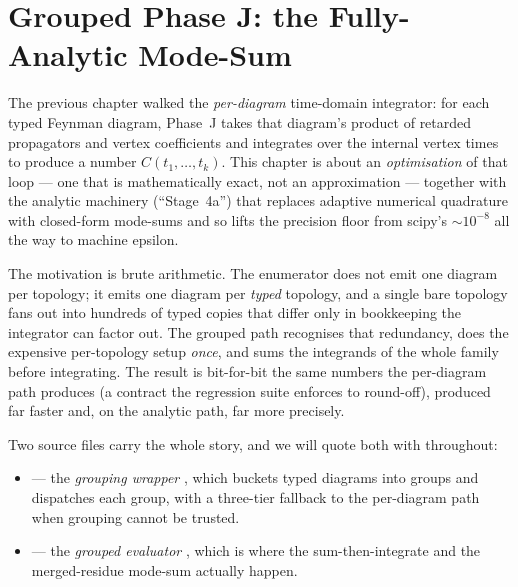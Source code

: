 \chapter{Grouped Phase J: the Fully-Analytic Mode-Sum}\label{ch:grouped-phasej}

The previous chapter walked the \emph{per-diagram} time-domain integrator: for
each typed Feynman diagram, Phase~J takes that diagram's product of retarded
propagators and vertex coefficients and integrates over the internal vertex
times to produce a number $C(t_1, \dots, t_k)$. This chapter is about an
\emph{optimisation} of that loop --- one that is mathematically exact, not an
approximation --- together with the analytic machinery (``Stage~4a'') that
replaces adaptive numerical quadrature with closed-form mode-sums and so lifts
the precision floor from scipy's $\sim\!10^{-8}$ all the way to machine epsilon.

The motivation is brute arithmetic. The enumerator does not emit one diagram per
topology; it emits one diagram per \emph{typed} topology, and a single bare
topology fans out into hundreds of typed copies that differ only in bookkeeping
the integrator can factor out. The grouped path recognises that redundancy, does
the expensive per-topology setup \emph{once}, and sums the integrands of the
whole family before integrating. The result is bit-for-bit the same numbers the
per-diagram path produces (a contract the regression suite enforces to
round-off), produced far faster and, on the analytic path, far more precisely.

Two source files carry the whole story, and we will quote both with
 throughout:
\begin{itemize}
  \item {} --- the \emph{grouping wrapper}
        , which buckets typed diagrams
        into groups and dispatches each group, with a three-tier fallback to the
        per-diagram path when grouping cannot be trusted.
  \item {} --- the
        \emph{grouped evaluator} , which is
        where the sum-then-integrate and the merged-residue mode-sum actually
        happen.
\end{itemize}

